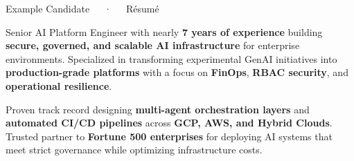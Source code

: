 \documentclass[11pt, a4paper]{awesome-cv}
\begin{document}
\makecvheader[C]

\makecvfooter
  {}
  {Example Candidate~~~·~~~Résumé}
  {\thepage}

\vspace{-1.0em}

\begin{cvparagraph}
Senior AI Platform Engineer with nearly \textbf{7 years of experience} building \textbf{secure, governed, and scalable AI infrastructure} for enterprise environments. Specialized in transforming experimental GenAI initiatives into \textbf{production-grade platforms} with a focus on \textbf{FinOps}, \textbf{RBAC security}, and \textbf{operational resilience}.

Proven track record designing \textbf{multi-agent orchestration layers} and \textbf{automated CI/CD pipelines} across \textbf{GCP, AWS, and Hybrid Clouds}. Trusted partner to \textbf{Fortune 500 enterprises} for deploying AI systems that meet strict governance while optimizing infrastructure costs.
\end{cvparagraph}

\vspace{-1.0em}

\vspace{-0.5em}
\end{document}
